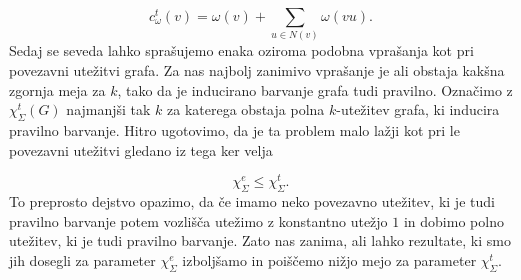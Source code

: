 \documentclass[12pt,a4paper,twoside]{article}
\theoremstyle{definition} %
\theoremstyle{plain} %
\newcommand{\ec}{\chi_{\Sigma}^e}
\newcommand{\ect}{\chi_{\Sigma}^t}
\numberwithin{equation}{section}  %
\begin{document}
$$c_{\omega}^t(v)  = \omega(v) +  \sum_{u \in N(v)} \omega(vu).$$
Sedaj se seveda lahko sprašujemo enaka oziroma podobna vprašanja kot pri povezavni utežitvi grafa. Za nas najbolj zanimivo vprašanje je ali obstaja kakšna zgornja meja za $k$, tako da je inducirano barvanje grafa tudi pravilno. Označimo z $\ect(G)$ najmanjši tak $k$ za katerega obstaja polna $k$-utežitev grafa, ki inducira pravilno barvanje. Hitro ugotovimo, da je ta problem malo lažji kot pri le povezavni utežitvi gledano iz tega ker velja

$$ \ec \le \ect. $$
To preprosto dejstvo opazimo, da če imamo neko povezavno utežitev, ki je tudi pravilno barvanje potem vozlišča utežimo z konstantno utežjo $1$ in dobimo polno utežitev, ki je tudi pravilno barvanje. Zato nas zanima, ali lahko rezultate, ki smo jih dosegli za parameter $\ec$ izboljšamo in poiščemo nižjo mejo za parameter $\ect$.
\end{document}
